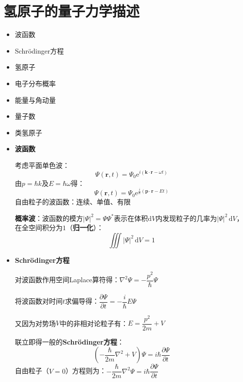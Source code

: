 \documentclass{beamer}
\renewcommand{\bm}{\symbf}
\let\sectiononly\section
\renewcommand{\section}[1]{
    \sectiononly{#1}
    \let\sectiontitle\relax
    \newcommand{\sectiontitle}{#1}
}
\newenvironment{slide}{
    \begin{frame}{\bfseries{\sectiontitle}}
}{
    \end{frame}
}
\begin{document}
\section{氢原子的量子力学描述}

\begin{slide}
    \begin{itemize}
        \item 波函数
        \item Schrödinger方程
        \item 氢原子
        \item 电子分布概率
        \item 能量与角动量
        \item 量子数
        \item 类氢原子
    \end{itemize}
\end{slide}

\begin{slide}
    \begin{itemize}
        \item \textbf{波函数}

        考虑平面单色波：
        \[
            \Psi(\bm{r},t) = \Psi_0\mathrm{e}^{i(\bm{k}\cdot\bm{r}-\omega t)}
        \]
        由$p=\hbar k$及$E=\hbar\omega$得：
        \[
            \Psi(\bm{r},t) = \Psi_0\mathrm{e}^{\tfrac{i}{\hbar}(\bm{p}\cdot\bm{r}-Et)}
        \]
        自由粒子的波函数：连续、单值、有限

        \textbf{概率波}：波函数的模方$|\Psi|^2=\Psi\Psi^*$表示在体积$\mathrm{d}V$内发现粒子的几率为$|\Psi|^2\,\mathrm{d}V$，在全空间积分为$1$（\textbf{归一化}）：
        \[
            \iiint |\Psi|^2\,\mathrm{d}V = 1
        \]
    \end{itemize}
\end{slide}

\begin{slide}
    \begin{itemize}
        \item \textbf{Schrödinger方程}

        对波函数作用空间Laplace算符得：$\nabla^2\Psi = -\dfrac{p^2}{\hbar}\Psi$

        将波函数对时间$t$求偏导得：$\dfrac{\partial\Psi}{\partial t} = -\dfrac{i}{\hbar}E\Psi$

        又因为对势场$V$中的非相对论粒子有：$E = \dfrac{p^2}{2m} + V$

        联立即得一般的\textbf{Schrödinger方程}：
        \[
            \boxed{
            \left(-\frac{\hbar}{2m}\nabla^2 + V\right)\Psi = i\hbar\frac{\partial\Psi}{\partial t}
            }
        \]
        自由粒子（$V=0$）方程则为：$\boxed{-\dfrac{\hbar}{2m}\nabla^2\Psi = i\hbar\dfrac{\partial\Psi}{\partial t}}$
    \end{itemize}
\end{slide}
\end{document}
